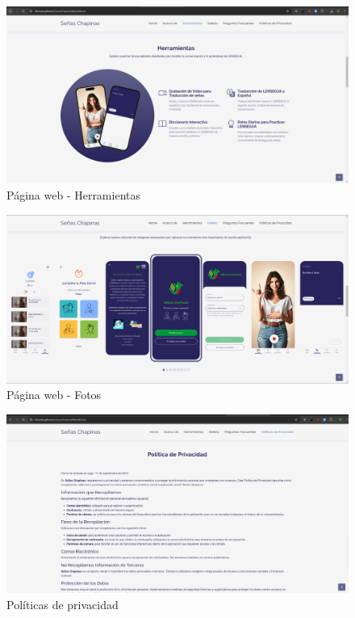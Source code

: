 \begin{itemize}
\begin{itemize}
        \begin{figure}[H]
            \centering
            \includegraphics[width=0.8\linewidth]{figuras/pagina_web_herramientas.png}
            \caption{Página web - Herramientas}
            \label{fig:enter-label}
        \end{figure}

        \begin{figure}
            \centering
            \includegraphics[width=0.8\linewidth]{figuras/web_fotos.png}
            \caption{Página web - Fotos}
            \label{fig:enter-label}
        \end{figure}


        \begin{figure} [H]
            \centering
            \includegraphics[width=0.8\linewidth]{figuras/pagina_web_politicas.png}
            \caption{Políticas de privacidad}
            \label{fig:enter-label}
        \end{figure}


\end{itemize}
\end{itemize}

